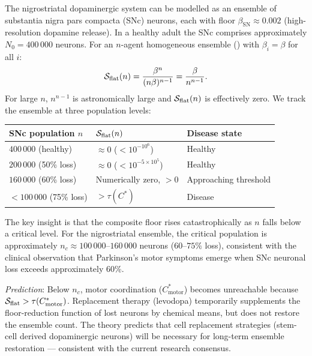 \begin{example}
\label{ex:ch02b-parkinsons}
The nigrostriatal dopaminergic system can be modelled as an ensemble of
substantia nigra pars compacta (SNc) neurons, each with floor $\beta_{\mathrm{SN}}
\approx 0.002$ (high-resolution dopamine release).  In a healthy adult the
SNc comprises approximately $N_0 = 400\,000$ neurons.  For an $n$-agent
homogeneous ensemble () with $\beta_i = \beta$ for all $i$:
\[
  \mathcal{S}_{\mathrm{flat}}(n)
  = \frac{\beta^n}{(n\beta)^{n-1}}
  = \frac{\beta}{n^{n-1}}.
\]
For large $n$, $n^{n-1}$ is astronomically large and $\mathcal{S}_{\mathrm{flat}}(n)$
is effectively zero.  We track the ensemble at three population levels:

\begin{center}
\begin{tabular}{@{}lll@{}}
\toprule
SNc population $n$ & $\mathcal{S}_{\mathrm{flat}}(n)$ & Disease state \\
\midrule
$400\,000$ (healthy)    & $\approx 0$ ($< 10^{-10^6}$) & Healthy \\
$200\,000$ (50\% loss)  & $\approx 0$ ($< 10^{-5\times10^5}$) & Healthy \\
$160\,000$ (60\% loss)  & Numerically zero, $> 0$ & Approaching threshold \\
$< 100\,000$ (75\% loss) & $> \tau(C^*)$ & Disease \\
\bottomrule
\end{tabular}
\end{center}

The key insight is that the composite floor rises catastrophically as $n$
falls below a critical level.  For the nigrostriatal ensemble, the critical
population is approximately $n_c \approx 100\,000$--$160\,000$ neurons
($60$--$75\%$ loss), consistent with the clinical observation that Parkinson's
motor symptoms emerge when SNc neuronal loss exceeds approximately 60\%.

\emph{Prediction}: Below $n_c$, motor coordination ($C^*_{\mathrm{motor}}$)
becomes unreachable because $\mathcal{S}_{\mathrm{flat}} > \tau(C^*_{\mathrm{motor}})$.
Replacement therapy (levodopa) temporarily supplements the floor-reduction
function of lost neurons by chemical means, but does not restore the ensemble
count.  The theory predicts that cell replacement strategies (stem-cell derived
dopaminergic neurons) will be necessary for long-term ensemble restoration —
consistent with the current research consensus.
\end{example}

